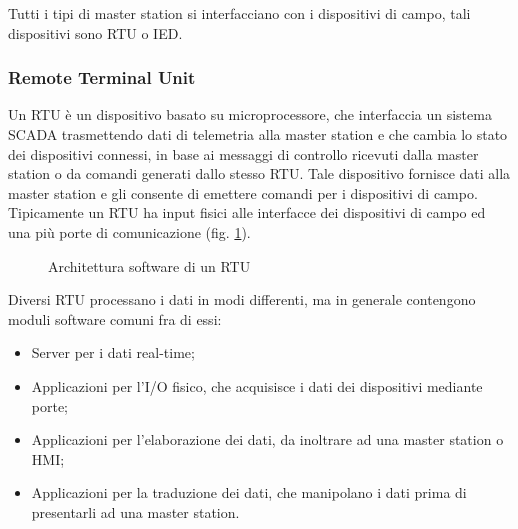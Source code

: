 Tutti i tipi di master station si interfacciano con i dispositivi di campo, tali dispositivi sono RTU o IED.

\subsubsection{Remote Terminal Unit}
Un RTU è un dispositivo basato su microprocessore, che interfaccia un sistema SCADA trasmettendo dati di telemetria alla master station e che cambia lo stato dei dispositivi connessi, in base ai messaggi di controllo ricevuti dalla master station o da comandi generati dallo stesso RTU. Tale dispositivo fornisce dati alla master station e gli consente di emettere comandi per i dispositivi di campo. Tipicamente un  
RTU ha input fisici alle interfacce dei dispositivi di campo ed una  più porte di comunicazione (fig. \ref{fig:6}).

\begin{figure}[h] 
\caption{Architettura software di un RTU}\label{fig:6}
\end{figure}

Diversi RTU processano i dati in modi differenti, ma in generale contengono moduli software comuni fra di essi:
\begin{itemize}
	\item Server per i dati real-time;
	\item Applicazioni per l'I/O fisico, che acquisisce i dati dei dispositivi mediante porte;
	\item Applicazioni per l'elaborazione dei dati, da inoltrare ad una master station o HMI;
	\item Applicazioni per la traduzione dei dati, che manipolano i dati prima di presentarli ad una master station.
\end{itemize}

